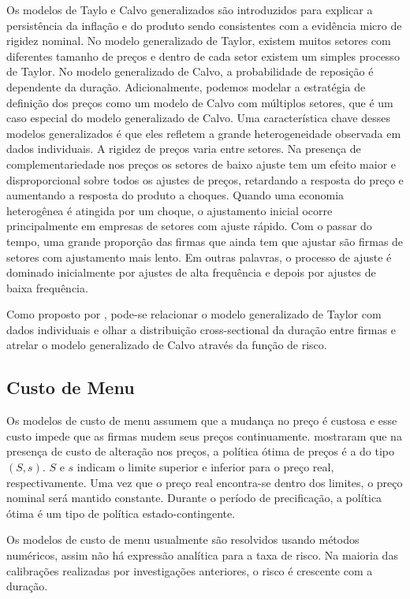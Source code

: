 \documentclass[twoside,a4paper,11pt]{report}
\begin{document}
Os modelos de Taylo e Calvo generalizados são introduzidos para explicar a persistência da inflação e do produto sendo consistentes com a evidência micro de rigidez nominal. No modelo generalizado de Taylor, existem muitos setores com diferentes tamanho de preços e dentro de cada setor existem um simples processo de Taylor. No modelo generalizado de Calvo, a probabilidade de reposição é dependente da duração. Adicionalmente, podemos modelar a estratégia de definição dos preços como um modelo de Calvo com múltiplos setores, que é um caso especial do modelo generalizado de Calvo. Uma característica chave desses modelos generalizados é que eles refletem a grande heterogeneidade observada em dados individuais. A rigidez de preços varia entre setores. Na presença de complementariedade nos preços os setores de baixo ajuste tem um efeito maior e disproporcional sobre todos os ajustes de preços, retardando a resposta do preço e aumentando a resposta do produto a choques. Quando uma economia heterogênea é atingida por um choque, o ajustamento inicial ocorre principalmente em empresas de setores com ajuste rápido. Com o passar do tempo, uma grande proporção das firmas que ainda tem que ajustar são firmas de setores com ajustamento mais lento. Em outras palavras, o processo de ajuste é dominado inicialmente por ajustes de alta frequência e depois por ajustes de baixa frequência. 

Como proposto por \citet{dixon2012generalised}, pode-se relacionar o modelo generalizado de Taylor com dados individuais e olhar a distribuição cross-sectional da duração entre firmas e atrelar o modelo generalizado de Calvo através da função de risco. 

\subsection*{Custo de Menu}

Os modelos de custo de menu assumem que a mudança no preço é custosa e esse custo impede que as firmas mudem seus preços continuamente. \citet{sheshinski1977inflation} mostraram que na presença de custo de alteração nos preços, a política ótima de preços é a do tipo $(S,s)$. $S$ e $s$ indicam o limite superior e inferior para o preço real, respectivamente. Uma vez que o preço real encontra-se dentro dos limites, o preço nominal será mantido constante. Durante o período de precificação, a política ótima é um tipo de política estado-contingente.

Os modelos de custo de menu usualmente são resolvidos usando métodos numéricos, assim não há expressão analítica para a taxa de risco. Na maioria das calibrações realizadas por investigações anteriores, o risco é crescente com a duração.
\end{document}
